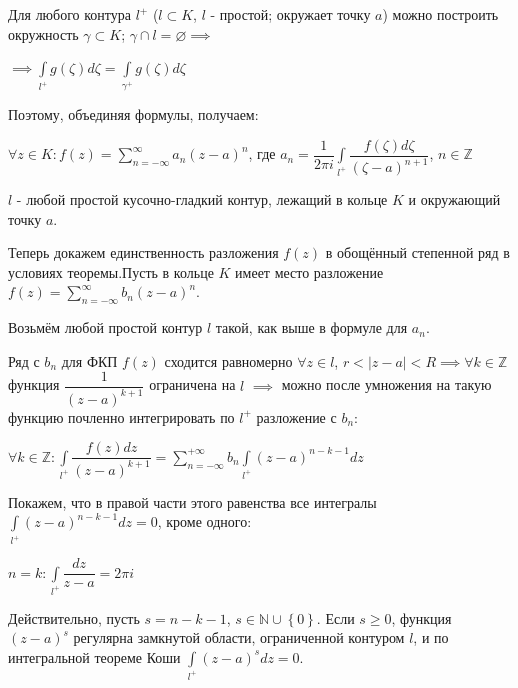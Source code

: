 \documentclass[a4paper, 12pt]{article}
\begin{document}
  \quad Для любого контура $l^+$ ($ l \subset K$, $l$ - простой; окружает точку $a$) можно построить окружность $\gamma \subset K$; $\gamma \cap l = \varnothing \implies$

  \begin{center}
    $\implies \displaystyle\int\limits_{l^+} g(\zeta) d\zeta = \displaystyle\int\limits_{\gamma^+} g(\zeta) d\zeta$
  \end{center}

  \quad Поэтому, объединяя формулы, получаем:

  \begin{center}
    $\forall z \in K : f(z) = \displaystyle\sum\limits_{n=-\infty}^{\infty} a_n (z-a)^n$, где $a_n = \dfrac{1}{2 \pi i} \displaystyle\int\limits_{l^+} \dfrac{f(\zeta) d\zeta}{(\zeta - a)^{n+1}}$, $n \in \mathbb {Z}$
  \end{center}

  \quad $l$ - любой простой кусочно-гладкий контур, лежащий в кольце $K$ и окружающий точку $a$.

  \quad Теперь докажем единственность разложения $f(z)$ в обощённый степенной ряд в условиях теоремы.Пусть в кольце $K$ имеет место разложение $f(z) = \displaystyle\sum\limits_{n=-\infty}^{\infty} b_n (z-a)^n$.

  \quad Возьмём любой простой контур $l$ такой, как выше в формуле для $a_n$. 

  \quad Ряд с $b_n$ для ФКП $f(z)$ сходится равномерно $\forall z \in l$, $r < |z - a| < R \implies 
  \forall k \in \mathbb{Z}$ функция $\dfrac{1}{(z-a)^{k+1}}$ ограничена на $l$ $\implies$ можно после умножения на такую функцию почленно интегрировать по $l^+$ разложение с $b_n$:

  \begin{center}
    $\forall k \in \mathbb{Z} : \displaystyle\int\limits_{l^+} \dfrac{f(z) dz}{(z-a)^{k+1}} = \displaystyle\sum\limits_{n=-\infty}^{+\infty} b_n \displaystyle\int\limits_{l^+} (z-a)^{n-k-1} dz$
  \end{center}

  \quad Покажем, что в правой части этого равенства все интегралы $\displaystyle\int\limits_{l^+} (z-a)^{n-k-1} dz = 0$, кроме одного:

  \begin{center}
    $n=k : \displaystyle\int\limits_{l^+} \dfrac{dz}{z-a} = 2\pi i$
  \end{center}

  \quad Действительно, пусть $s = n - k - 1$, $s \in \mathbb{N} \cup \left\{ 0 \right\}$. Если $s \geq 0$, функция $(z-a)^s$ регулярна замкнутой области, ограниченной контуром $l$, и по интегральной теореме Коши $\displaystyle\int\limits_{l^+} (z-a)^s dz = 0$. 
\end{document}
